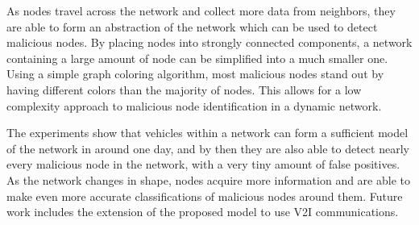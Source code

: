 \documentclass[conference]{IEEEtran}
\begin{document}
As nodes travel across the network and collect more data from neighbors, they are able to form an abstraction of the network which can be used to detect malicious nodes.
By placing nodes into strongly connected components, a network containing a large amount of node can be simplified into a much smaller one.
Using a simple graph coloring algorithm, most malicious nodes stand out by having different colors than the majority of nodes.
This allows for a low complexity approach to malicious node identification in a dynamic network.

The experiments show that vehicles within a network can form a sufficient model of the network in around one day, and by then they are also able to detect nearly every malicious node in the network, with a very tiny amount of false positives.
As the network changes in shape, nodes acquire more information and are able to make even more accurate classifications of malicious nodes around them. Future work includes the extension of the proposed model to use V2I communications.



%
%









%
%
%




\end{document}
